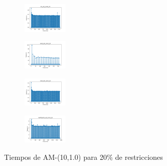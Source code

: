 \begin{figure}[H]
\begin{subfigure}
    \end{subfigure}
    \hfill
    \begin{subfigure}
        \centering
        \includegraphics[width=0.234\textwidth]{img/am10/iris_set_const_20_3773969821_time.png}
    \end{subfigure}
    \hfill
    \begin{subfigure}
        \centering
        \includegraphics[width=0.234\textwidth]{img/am10/ecoli_set_const_20_3773969821_time.png}
    \end{subfigure}
    \hfill
    \begin{subfigure}
        \centering
        \includegraphics[width=0.234\textwidth]{img/am10/rand_set_const_20_3773969821_time.png}
    \end{subfigure}
    \hfill
    \begin{subfigure}
        \centering
        \includegraphics[width=0.234\textwidth]{img/am10/newthyroid_set_const_20_3773969821_time.png}
    \end{subfigure}
    \caption{Tiempos de AM-(10,1.0) para 20\% de restricciones}
\end{figure}

\vspace*{\fill}
\newpage
\vspace*{\fill}

